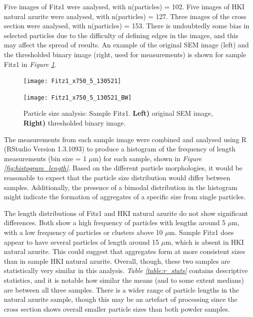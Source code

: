 Five images of Fitz1 were analysed, with n(particles) = 102. Five images of HKI natural azurite were analysed, with n(particles) = 127. Three images of the cross section were analysed, with n(particles) = 153. There is undoubtedly some bias in selected particles due to the difficulty of defining edges in the images, and this may affect the spread of results. An example of the original SEM image (left) and the thresholded binary image (right, used for measurements) is shown for sample Fitz1 in \textit{Figure \ref{fig:imageJ_fitz1}}.

\begin{figure}[H]
\centering
\begin{minipage}{.45\textwidth}
  \centering
  \texttt{[image: Fitz1\_x750\_5\_130521]}
\end{minipage}
\begin{minipage}{.45\textwidth}
  \centering
  \texttt{[image: Fitz1\_x750\_5\_130521\_BW]}
\end{minipage}
\caption[Particle size analysis: Sample Fitz1]{Particle size analysis: Sample Fitz1. \textbf{Left)} original SEM image, \textbf{Right)} thresholded binary image.}
\label{fig:imageJ_fitz1}
\end{figure}

The measurements from each sample image were combined and analysed using R (RStudio Version 1.3.1093) to produce a histogram of the frequency of length measurements (bin size = 1 $\mu$m) for each sample, shown in \textit{Figure \ref{fig:histogram_length}}. Based on the different particle morphologies, it would be reasonable to expect that the particle size distribution would differ between samples. Additionally, the presence of a bimodal distribution in the histogram might indicate the formation of aggregates of a specific size from single particles. 

The length distributions of Fitz1 and HKI natural azurite do not show significant differences. Both show a high frequency of particles with lengths around 5 $\mu$m, with a low frequency of particles or clusters above 10 $\mu$m. Sample Fitz1 does appear to have several particles of length around 15 $\mu$m, which is absent in HKI natural azurite. This could suggest that aggregates form at more consistent sizes than in sample HKI natural azurite. Overall, though, these two samples are statistically very similar in this analysis. \textit{Table \ref{table:r_stats}} contains descriptive statistics, and it is notable how similar the means (and to some extent medians) are between all three samples. There is a wider range of particle lengths in the natural azurite sample, though this may be an artefact of processing since the cross section shows overall smaller particle sizes than both powder samples. 

